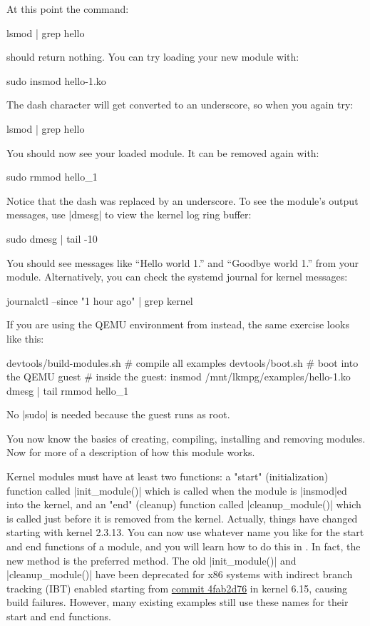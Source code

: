 \documentclass[10pt, oneside]{book}
\begin{document}
At this point the command:
\begin{codebash}
lsmod | grep hello
\end{codebash}

should return nothing.
You can try loading your new module with:
\begin{codebash}
sudo insmod hello-1.ko
\end{codebash}

The dash character will get converted to an underscore, so when you again try:
\begin{codebash}
lsmod | grep hello
\end{codebash}

You should now see your loaded module. It can be removed again with:
\begin{codebash}
sudo rmmod hello_1
\end{codebash}

Notice that the dash was replaced by an underscore.
To see the module's output messages, use \sh|dmesg| to view the kernel log ring buffer:
\begin{codebash}
sudo dmesg | tail -10
\end{codebash}

You should see messages like ``Hello world 1.'' and ``Goodbye world 1.'' from your module.
Alternatively, you can check the systemd journal for kernel messages:
\begin{codebash}
journalctl --since "1 hour ago" | grep kernel
\end{codebash}

If you are using the QEMU environment from  instead, the
same exercise looks like this:
\begin{codebash}
devtools/build-modules.sh        # compile all examples
devtools/boot.sh                 # boot into the QEMU guest
# inside the guest:
insmod /mnt/lkmpg/examples/hello-1.ko
dmesg | tail
rmmod hello_1
\end{codebash}
No \sh|sudo| is needed because the guest runs as root.

You now know the basics of creating, compiling, installing and removing modules.
Now for more of a description of how this module works.

Kernel modules must have at least two functions: a "start" (initialization) function called \cpp|init_module()| which is called when the module is \sh|insmod|ed into the kernel,
and an "end" (cleanup) function called \cpp|cleanup_module()| which is called just before it is removed from the kernel.
Actually, things have changed starting with kernel 2.3.13.
You can now use whatever name you like for the start and end functions of a module,
and you will learn how to do this in .
In fact, the new method is the preferred method.
The old \cpp|init_module()| and \cpp|cleanup_module()| have been deprecated for x86 systems with indirect branch tracking (IBT) enabled starting from \href{https://github.com/torvalds/linux/commit/4fab2d76}{commit 4fab2d76} in kernel 6.15, causing build failures.
However, many existing examples still use these names for their start and end functions.
\end{document}
